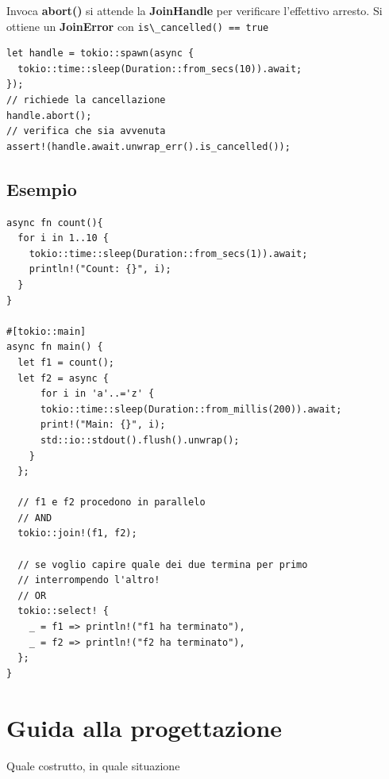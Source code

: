 Invoca \textbf{abort()} si attende la \textbf{JoinHandle} per verificare
l'effettivo arresto. Si ottiene un \textbf{JoinError} con \verb|is\_cancelled() == true|

\begin{verbatim}
let handle = tokio::spawn(async {
  tokio::time::sleep(Duration::from_secs(10)).await;
});
// richiede la cancellazione
handle.abort();
// verifica che sia avvenuta
assert!(handle.await.unwrap_err().is_cancelled());
\end{verbatim}

\subsection{Esempio}



\begin{verbatim}
async fn count(){
  for i in 1..10 {
    tokio::time::sleep(Duration::from_secs(1)).await;
    println!("Count: {}", i);
  }
}

#[tokio::main]
async fn main() {
  let f1 = count();
  let f2 = async {
      for i in 'a'..='z' {
      tokio::time::sleep(Duration::from_millis(200)).await;
      print!("Main: {}", i);
      std::io::stdout().flush().unwrap();
    }
  };

  // f1 e f2 procedono in parallelo
  // AND
  tokio::join!(f1, f2); 

  // se voglio capire quale dei due termina per primo
  // interrompendo l'altro!
  // OR
  tokio::select! {
    _ = f1 => println!("f1 ha terminato"),
    _ = f2 => println!("f2 ha terminato"),
  };
}
\end{verbatim}


\section{Guida alla progettazione}

Quale costrutto, in quale situazione

